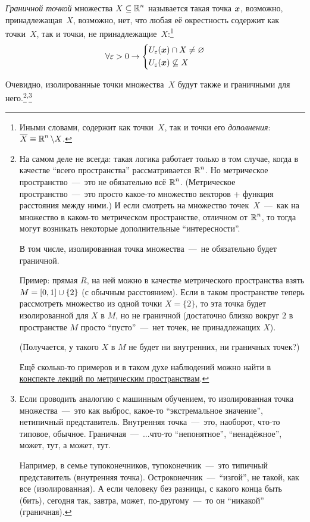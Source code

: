 \documentclass[a4paper,12pt]{article}
\begin{document}
  \begin{definition}
    \emph{Граничной точкой} множества $X \subseteq \operatorname{\mathbb R}^n$ называется такая точка $\boldsymbol x$, возможно, принадлежащая~$X$, возможно, нет, что любая её окрестность содержит как точки~$X$, так и точки, не принадлежащие~$X$:\footnote{
      Иными словами, содержит как точки~$X$, так и точки его \emph{дополнения}: $\overline{X} \hm\equiv \RR^n \hm\setminus X$.
    }
    \[
      \forall \varepsilon > 0 \to \left\{
        \begin{aligned}
          &U_{\varepsilon}(\boldsymbol x) \cap X \not= \varnothing\\
          &U_{\varepsilon}(\boldsymbol x) \not\subseteq X
        \end{aligned}
      \right.
    \]
  \end{definition}

  Очевидно, изолированные точки множества~$X$ будут также и граничными для него.\footnote{
    На самом деле не всегда: такая логика работает только в том случае, когда в качестве ``всего пространства'' рассматривается $\operatorname{\mathbb R}^n$.
    Но метрическое пространство~---~это не обязательно всё $\operatorname{\mathbb R}^n$.
    (Метрическое пространство~---~это просто какое-то множество векторов + функция расстояния между ними.)
    И если смотреть на множество точек~$X$~---~как на множество в каком-то метрическом пространстве, отличном от $\operatorname{\mathbb R}^n$, то тогда могут возникать некоторые дополнительные ``интересности''.

    В том числе, изолированная точка множества~---~не обязательно будет граничной.
    
    Пример: прямая $R$, на ней можно в качестве метрического пространства взять $M \hm= [0, 1] \hm\cup \{2\}$ (с обычным расстоянием).
    Если в таком пространстве теперь рассмотреть множество из одной точки $X = \{2\}$, то эта точка будет изолированной для $X$ в $M$, но не граничной (достаточно близко вокруг $2$ в пространстве $M$ просто ``пусто''~---~нет точек, не принадлежащих $X$).
    
    (Получается, у такого $X$ в $M$ не будет ни внутренних, ни граничных точек?)
    
    Ещё сколько-то примеров и в таком духе наблюдений можно найти в \href{http://math.phys.msu.ru/data/129/lec04a.pdf}{конспекте лекций по метрическим пространствам}.
  }\textsuperscript{,}\footnote{
    Если проводить аналогию с машинным обучением, то изолированная точка множества~---~это как выброс, какое-то ``экстремальное значение'', нетипичный представитель.
    Внутренняя точка~---~это, наоборот, что-то типовое, обычное.
    Граничная~---~...что-то ``непонятное'', ``ненадёжное'', может, тут, а может, тут.

    Например, в семье тупоконечников, тупоконечник~---~это типичный представитель (внутренняя точка).
    Остроконечник~---~``изгой'', не такой, как все (изолированная).
    А если человеку без разницы, с какого конца быть (бить), сегодня так, завтра, может, по-другому~---~то он ``никакой'' (граничная).
  }
\end{document}
